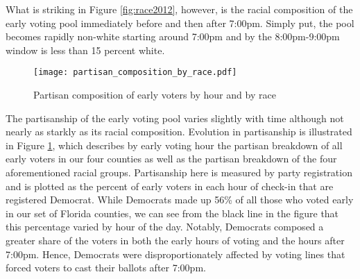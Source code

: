 \documentclass[12pt,titlepage]{article}
\begin{document}



What is striking in Figure \ref{fig:race2012}, however, is the racial
composition of the early voting pool immediately before and then after
7:00pm.  Simply put, the pool becomes rapidly non-white starting
around 7:00pm and by the 8:00pm-9:00pm window is less than 15 percent
white.

\begin{figure}[!ht]
\caption{Partisan composition of early voters by hour and by race}
  \label{fig:party2012}
  \centering
    \centering\texttt{[image: partisan\_composition\_by\_race.pdf]}
\end{figure}

The partisanship of the early voting pool varies slightly with time
although not nearly as starkly as its racial composition.  Evolution
in partisanship is illustrated in Figure \ref{fig:party2012}, which
describes by early voting hour the partisan breakdown of all early
voters in our four counties as well as the partisan breakdown of the
four aforementioned racial groups.  Partisanship here is measured by
party registration and is plotted as the percent of early voters in
each hour of check-in that are registered Democrat.  While Democrats
made up 56\% of all those who voted early in our set of Florida
counties, we can see from the black line in the figure that this
percentage varied by hour of the day.  Notably, Democrats composed a
greater share of the voters in both the early hours of voting and the
hours after 7:00pm.  Hence, Democrats were disproportionately affected
by voting lines that forced voters to cast their ballots after 7:00pm.
\end{document}
